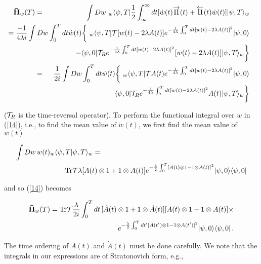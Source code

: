 \documentclass[12pt]{article}
\begin{document}
\begin{eqnarray}\label{14}
{\bf \bar{H}}_{w}(T)
&=&\int Dw\ _{w}\langle \psi,T|\frac{1}{2}\int_{\infty}^{\infty}dt
[\dot{w}(t)\overrightarrow\Pi (t) + \overleftarrow\Pi (t)\dot{w}(t)]|\psi,T\rangle_{w}\nonumber\\
&&\!\!\!\!\!\!\!\!\!\!\!\!\!\!\!\!\!\!\!\!\!\!\!\!\!\!\!\!\!\!
\!\!\!\!\!=\frac{-1}{4\lambda i}\int Dw\int_{0}^{T}dt\dot{w}(t) 
\biggl\{\ _{w}\langle \psi,T|{\cal T}[w(t)-2\lambda A(t)]
e^{-\frac{1}{4\lambda}\int_{0}^{T}dt[w(t)-2\lambda A(t)]^{2}}|\psi,0\rangle\nonumber\\
&&\qquad - \langle \psi,0|{\cal T}_{R}
e^{-\frac{1}{4\lambda}\int_{0}^{T}dt[w(t)-2\lambda A(t)]^{2}}
[w(t)-2\lambda A(t)]|\psi,T\rangle_{w} \biggr\}\nonumber\\
&=&\frac{1}{2i}\int Dw\int_{0}^{T}dt\dot{w}(t) 
\biggl\{\ _{w}\langle \psi,T|{\cal T}A(t)
e^{-\frac{1}{4\lambda}\int_{0}^{T}dt[w(t)-2\lambda A(t)]^{2}}|\psi,0\rangle\nonumber\\
&&\qquad\qquad\qquad - \langle \psi,0|{\cal T}_{R}
e^{-\frac{1}{4\lambda}\int_{0}^{T}dt[w(t)-2\lambda A(t)]^{2}}
A(t)|\psi,T\rangle_{w} \biggr\}
\end{eqnarray} 

\noindent(${\cal T}_{R}$ is the time-reversal operator). 
To perform the functional integral over $w$ in (\ref{14}), i.e., to find the mean value of  $\dot{w}(t)$, 
we first find the mean value of ${w}(t)$ 

\begin{eqnarray*}
\int Dw\, w(t)_{w}\langle \psi,T|\psi,T\rangle_{w}&=&\\
&&\!\!\!\!\!\!\!\!\!\!\!\!\!\!\!\!\!\!\!\!\!\!\!\!\!\!\!\!\!\!\!\!\!\!\!\!{\rm Tr}{\cal T}\lambda 
[A(t)\otimes 1+1\otimes A(t)]e^
	{-\frac{\lambda}{2}\int_{0}^{T}[A(t)\otimes 1-1\otimes A(t)]^{2}}
	|\psi,0\rangle\langle \psi,0|
\end{eqnarray*}

\noindent and so (\ref{14}) becomes

\begin{eqnarray}\label{15}
{\bf \bar{H}}_{w}(T)={\rm Tr}{\cal T}\frac{\lambda}{2i}\int_{0}^{T}dt\,
[\dot{A}(t)\otimes 1+1\otimes \dot{A}(t)][A(t)\otimes 1-1\otimes A(t)]\times\nonumber\\
\qquad\qquad e^{-\frac{\lambda}{2}\int_{0}^{T}dt'[A(t')\otimes 1-1\otimes A(t')]^{2}}
	|\psi,0\rangle\langle \psi,0|\, .
\end{eqnarray}

\noindent The time ordering of $A(t)$ and $\dot{A}(t)$ must be done carefully. We note 
that the integrals in our expressions are of Stratonovich form, e.g.,
 
\end{document}
